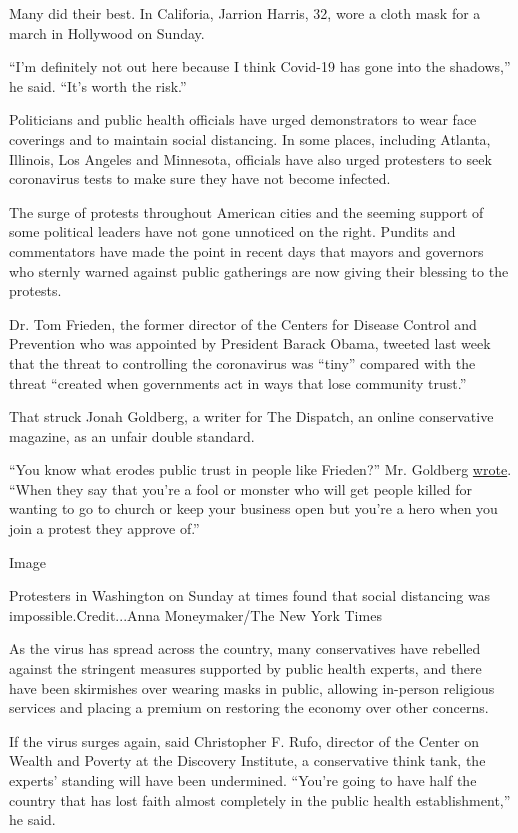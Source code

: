 Many did their best. In Califoria, Jarrion Harris, 32, wore a cloth mask
for a march in Hollywood on Sunday.

``I'm definitely not out here because I think Covid-19 has gone into the
shadows,'' he said. ``It's worth the risk.''

Politicians and public health officials have urged demonstrators to wear
face coverings and to maintain social distancing. In some places,
including Atlanta, Illinois, Los Angeles and Minnesota, officials have
also urged protesters to seek coronavirus tests to make sure they have
not become infected.

The surge of protests throughout American cities and the seeming support
of some political leaders have not gone unnoticed on the right. Pundits
and commentators have made the point in recent days that mayors and
governors who sternly warned against public gatherings are now giving
their blessing to the protests.

Dr. Tom Frieden, the former director of the Centers for Disease Control
and Prevention who was appointed by President Barack Obama, tweeted last
week that the threat to controlling the coronavirus was ``tiny''
compared with the threat ``created when governments act in ways that
lose community trust.''

That struck Jonah Goldberg, a writer for The Dispatch, an online
conservative magazine, as an unfair double standard.

``You know what erodes public trust in people like Frieden?'' Mr.
Goldberg
\href{https://gfile.thedispatch.com/p/the-treason-of-epidemiologists}{wrote}.
``When they say that you're a fool or monster who will get people killed
for wanting to go to church or keep your business open but you're a hero
when you join a protest they approve of.''

Image

Protesters in Washington on Sunday at times found that social distancing
was impossible.Credit...Anna Moneymaker/The New York Times

As the virus has spread across the country, many conservatives have
rebelled against the stringent measures supported by public health
experts, and there have been skirmishes over wearing masks in public,
allowing in-person religious services and placing a premium on restoring
the economy over other concerns.

If the virus surges again, said Christopher F. Rufo, director of the
Center on Wealth and Poverty at the Discovery Institute, a conservative
think tank, the experts' standing will have been undermined. ``You're
going to have half the country that has lost faith almost completely in
the public health establishment,'' he said.

